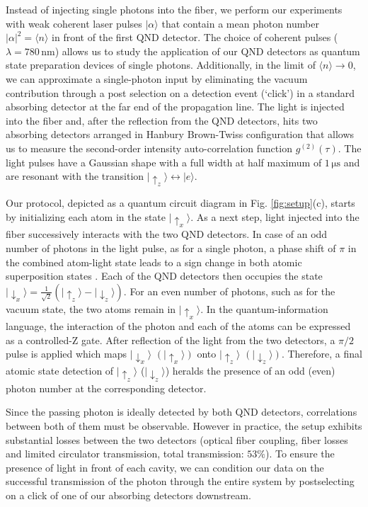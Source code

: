 \documentclass[prl,twocolumn,amsmath,amssymb,bibnotes,aps,longbibliography]{revtex4-1}
\newcommand{\ket}[1]{|{#1}\rangle}
\newcommand{\braket}[1]{\langle{#1}\rangle}
\begin{document}
Instead of injecting single photons into the fiber, we perform our experiments with weak coherent laser pulses $\ket{\alpha}$ that contain a mean photon number $\vert\alpha\vert^2=\braket{n}$ in front of the first QND detector. The choice of coherent pulses ($\lambda=780\,\mathrm{nm}$) allows us to study the application of our QND detectors as quantum state preparation devices of single photons. Additionally, in the limit of $\braket{n}\rightarrow 0$, we can approximate a single-photon input by eliminating the vacuum contribution through a post selection on a detection event (`click') in a standard absorbing detector at the far end of the propagation line. The light is injected into the fiber and, after the reflection from the QND detectors, hits two absorbing detectors arranged in Hanbury Brown-Twiss configuration that allows us to measure the second-order intensity auto-correlation function $g^{(2)}(\tau)$. The light pulses have a Gaussian shape with a full width at half maximum of $1\,\mathrm{\mu s}$ and are resonant with the transition $\ket{\uparrow_z}\leftrightarrow\ket{e}$.

Our protocol, depicted as a quantum circuit diagram in Fig. \ref{fig:setup}(c), starts by initializing each atom in the state $\ket{\uparrow_x}$. As a next step, light injected into the fiber successively interacts with the two QND detectors. In case of an odd number of photons in the light pulse, as for a single photon, a phase shift of $\pi$ in the combined atom-light state leads to a sign change in both atomic superposition states \cite{duan2004, xiao2004, reiserer2013, tiecke2014}. Each of the QND detectors then occupies the state $\ket{\downarrow_x}=\frac{1}{\sqrt{2}}(\ket{\uparrow_z}-\ket{\downarrow_z})$. For an even number of photons, such as for the vacuum state, the two atoms remain in $\ket{\uparrow_x}$. In the quantum-information language, the interaction of the photon and each of the atoms can be expressed as a controlled-Z gate. After reflection of the light from the two detectors, a $\pi/2$ pulse is applied which maps $\ket{\downarrow_x}$ $(\ket{\uparrow_x})$ onto $\ket{\uparrow_z}$ $(\ket{\downarrow_z})$. Therefore, a final atomic state detection of $\ket{\uparrow_z}$ ($\ket{\downarrow_z}$) heralds the presence of an odd (even) photon number at the corresponding detector.

Since the passing photon is ideally detected by both QND detectors, correlations between both of them must be observable. However in practice, the setup exhibits substantial losses between the two detectors (optical fiber coupling, fiber losses and limited circulator transmission, total transmission: $53\%$). To ensure the presence of light in front of each cavity, we can condition our data on the successful transmission of the photon through the entire system by postselecting on a click of one of our absorbing detectors downstream.
\end{document}
